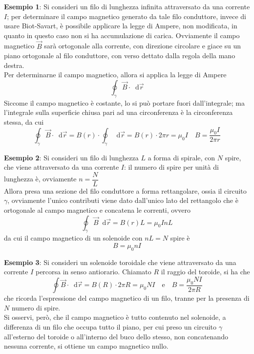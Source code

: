 \documentclass[a4paper]{extarticle}
\newcommand\dif{\mathop{}\!\mathrm{d}}
\begin{document}
\vspace{2em}
\noindent
\textbf{Esempio 1}: Si consideri un filo di lunghezza infinita attraversato da una corrente $I$; per determinare il campo magnetico generato da tale filo conduttore, invece di usare Biot-Savart, è possibile applicare la legge di Ampere, non modificata, in quanto in questo caso non si ha accumulazione di carica. Ovviamente il campo magnetico $\vec B$ sarà ortogonale alla corrente, con direzione circolare e giace su un piano ortogonale al filo conduttore, con verso dettato dalla regola della mano destra.\\
Per determinarne il campo magnetico, allora si applica la legge di Ampere
\[\oint_\gamma \vec B \cdot \dif \vec r\]
Siccome il campo magnetico è costante, lo si può portare fuori dall'integrale; ma l'integrale sulla superficie chiusa pari ad una circonferenza è la circonferenza stessa, da cui
\[\oint_\gamma \vec B \cdot \dif \vec r = B(r) \cdot \oint_\gamma \dif \vec r = B(r) \cdot 2\pi r = \mu_0 I \hspace{1em} B=\dfrac{\mu_0 I}{2 \pi r}\]

\vspace{2em}
\noindent
\textbf{Esempio 2}: Si consideri un filo di lunghezza $L$ a forma di spirale, con $N$ spire, che viene attraversato da una corrente $I$: il numero di spire per unità di lunghezza è, ovviamente $n=\dfrac{N}{L}$\\
Allora presa una sezione del filo conduttore a forma rettangolare, ossia il circuito $\gamma$, ovviamente l'unico contributi viene dato dall'unico lato del rettangolo che è ortogonale al campo magnetico e concatena le correnti, ovvero
\[\oint_\gamma \vec B \dif \vec r = B(r) L = \mu_0 I n L\]
da cui il campo magnetico di un solenoide con $n L = N$ spire è
\[\boxed{B=\mu_0 n I}\]

\vspace{2em}
\noindent
\textbf{Esempio 3}: Si consideri un solenoide toroidale che viene attraversato da una corrente $I$ percorsa in senso antiorario. Chiamato $R$ il raggio del toroide, si ha che
\[\oint \vec B \cdot \dif \vec r = B(R) \cdot 2 \pi R = \mu_0 N I \hspace{1em} \text{e} \hspace{1em} B = \dfrac{\mu_0 N I}{2 \pi R}\]
che ricorda l'espressione del campo magnetico di un filo, tranne per la presenza di $N$ numero di spire.\\
Si osservi, però, che il campo magnetico è tutto contenuto nel solenoide, a differenza di un filo che occupa tutto il piano, per cui preso un circuito $\gamma$ all'esterno del toroide o all'interno del buco dello stesso, non concatenando nessuna corrente, si ottiene un campo magnetico nullo.
\end{document}
